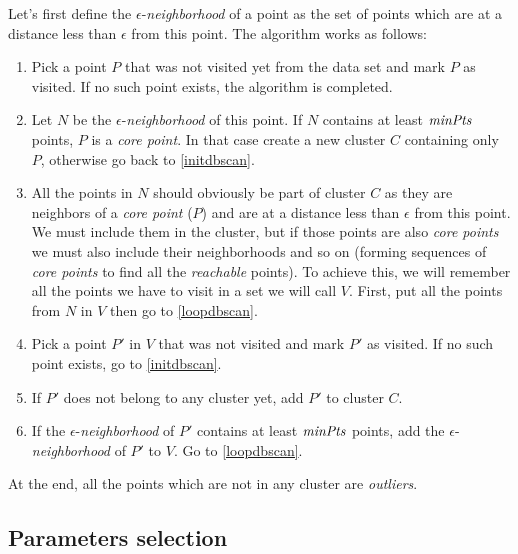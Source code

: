 Let's first define the $\epsilon$-\emph{neighborhood} of a point as the set of points which are at a distance less than $\epsilon$ from this point. The algorithm works as follows\cite{dbscan}:
\begin{enumerate}
	\item \label{initdbscan} Pick a point $P$ that was not visited yet from the data set and mark $P$ as visited. If no such point exists, the algorithm is completed.
	\item Let $N$ be the $\epsilon$-\emph{neighborhood} of this point. If $N$ contains at least $\mathit{minPts}$ points, $P$ is a \emph{core point}. In that case create a new cluster $C$ containing only $P$, otherwise go back to \ref{initdbscan}.
	\item All the points in $N$ should obviously be part of cluster $C$ as they are neighbors of a \emph{core point} ($P$) and are at a distance less than $\epsilon$ from this point. We must include them in the cluster, but if those points are also \emph{core points} we must also include their neighborhoods and so on (forming sequences of \emph{core points} to find all the \emph{reachable} points). To achieve this, we will remember all the points we have to visit in a set we will call $V$. First, put all the points from $N$ in $V$ then go to \ref{loopdbscan}.
	\item \label{loopdbscan} Pick a point $P'$ in $V$ that was not visited and mark $P'$ as visited. If no such point exists, go to \ref{initdbscan}.
	\item If $P'$ does not belong to any cluster yet, add $P'$ to cluster $C$.
	\item If the $\epsilon$-\emph{neighborhood} of $P'$ contains at least $\mathit{minPts}$ points, add the $\epsilon$-\emph{neighborhood} of $P'$ to $V$. Go to \ref{loopdbscan}.
\end{enumerate}

At the end, all the points which are not in any cluster are \emph{outliers}.

\subsection{Parameters selection}\label{subsec:paramselect}

